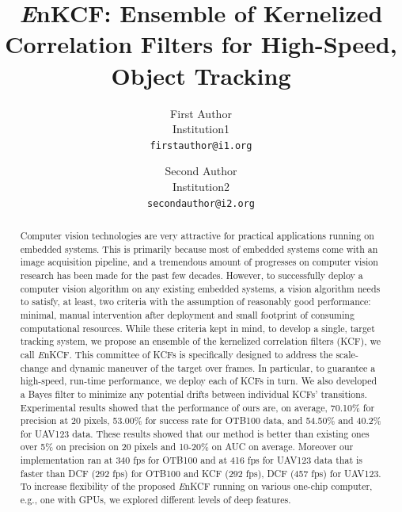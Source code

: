 \documentclass[10pt,twocolumn,letterpaper]{article}
\begin{document}
\title{{\it E}nKCF: Ensemble of Kernelized Correlation Filters for
  High-Speed, Object Tracking}

\author{First Author \\
Institution1\\
{\tt\small firstauthor@i1.org}
\and
Second Author \\
Institution2\\
{\tt\small secondauthor@i2.org}
}

\maketitle
\ifwacvfinal\thispagestyle{empty}\fi

\begin{abstract}
Computer vision technologies are very attractive for practical
applications running on embedded systems. This is primarily because
most of embedded systems come with an image acquisition pipeline, and
a tremendous amount of progresses on computer vision research has been
made for the past few decades. However, to successfully deploy a
computer vision algorithm on any existing embedded systems, a vision
algorithm needs to satisfy, at least, two criteria with the assumption
of reasonably good performance: minimal, manual intervention after
deployment and small footprint of consuming computational
resources. While these criteria kept in mind, to develop a single,
target tracking system, we propose an ensemble of the kernelized
correlation filters (KCF), we call {\it E}nKCF. This committee of KCFs
is specifically designed to address the scale-change and dynamic
maneuver of the target over frames. In particular, to guarantee a
high-speed, run-time performance, we deploy each of KCFs in turn. We
also developed a Bayes filter to minimize any potential drifts between
individual KCFs' transitions. Experimental results showed that the
performance of ours are, on average, 70.10\% for precision at 20
pixels, 53.00\% for success rate for OTB100 data, and 54.50\% and
40.2\% for UAV123 data. These results showed that our method is better
than existing ones over 5\% on precision on 20 pixels and 10-20\% on
AUC on average. Moreover our implementation ran at 340 fps for OTB100
and at 416 fps for UAV123 data that is faster than DCF (292 fps) for
OTB100 and KCF (292 fps), DCF (457 fps) for UAV123. To increase
flexibility of the proposed {\it E}nKCF running on various one-chip
computer, e.g., one with GPUs, we explored different levels of deep
features.
\end{abstract}
\end{document}
